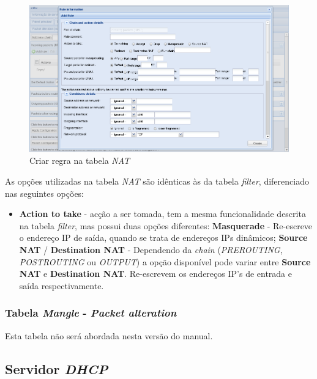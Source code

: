 \begin{figure}[H]
    \begin{center}
    \includegraphics[scale=0.38]{screenshots/etfw/etfw_firewall_04.png}
    \caption{Criar regra na tabela \textit{NAT}}
    \label{fig:etfw_firewall_03}
    \end{center}
\end{figure}

As opções utilizadas na tabela \textit{NAT} são idênticas às da tabela \textit{filter}, diferenciado nas seguintes opções:

\begin{itemize}
    \item \textbf{Action to take} - acção a ser tomada, tem a mesma funcionalidade descrita na tabela \textit{filter}, mas possui duas opções diferentes:
        \subitem \textbf{Masquerade} - Re-escreve o endereço IP de saída, quando se trata de endereços IPs dinâmicos;
        \subitem \textbf{Source NAT} / \textbf{Destination NAT} - Dependendo da \textit{chain} (\textit{PREROUTING}, \textit{POSTROUTING} ou \textit{OUTPUT}) a opção disponível pode variar entre \textbf{Source NAT} e \textbf{Destination NAT}. Re-escrevem os endereços IP's de entrada e saída respectivamente.
\end{itemize}

\subsubsection{Tabela \textit{Mangle} - \textit{Packet alteration}}

Esta tabela não será abordada nesta versão do manual.

\subsection{Servidor \textit{DHCP}}

